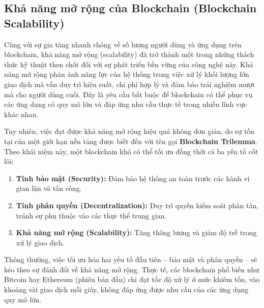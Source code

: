 

\subsection {Khả năng mở rộng của Blockchain (Blockchain Scalability)}
Cùng với sự gia tăng nhanh chóng về số lượng người dùng và ứng dụng trên blockchain, khả năng mở rộng (scalability) đã trở thành một trong những thách thức kỹ thuật then chốt đối với sự phát triển bền vững của công nghệ này. Khả năng mở rộng phản ánh năng lực của hệ thống trong việc xử lý khối lượng lớn giao dịch mà vẫn duy trì hiệu suất, chi phí hợp lý và đảm bảo trải nghiệm mượt mà cho người dùng cuối. Đây là yêu cầu bắt buộc để blockchain có thể phục vụ các ứng dụng có quy mô lớn và đáp ứng nhu cầu thực tế trong nhiều lĩnh vực khác nhau.

Tuy nhiên, việc đạt được khả năng mở rộng hiệu quả không đơn giản, do sự tồn tại của một giới hạn nền tảng được biết đến với tên gọi \textbf{Blockchain Trilemma}. Theo khái niệm này, một blockchain khó có thể tối ưu đồng thời cả ba yếu tố cốt lõi:
\begin{enumerate}
    \item \textbf{Tính bảo mật (Security):} Đảm bảo hệ thống an toàn trước các hành vi gian lận và tấn công.
    \item \textbf{Tính phân quyền (Decentralization):} Duy trì quyền kiểm soát phân tán, tránh sự phụ thuộc vào các thực thể trung gian.
    \item \textbf{Khả năng mở rộng (Scalability):} Tăng thông lượng và giảm độ trễ trong xử lý giao dịch.
\end{enumerate}

Thông thường, việc tối ưu hóa hai yếu tố đầu tiên – bảo mật và phân quyền – sẽ kéo theo sự đánh đổi về khả năng mở rộng. Thực tế, các blockchain phổ biến như Bitcoin hay Ethereum (phiên bản đầu) chỉ đạt tốc độ xử lý ở mức khiêm tốn, vào khoảng vài giao dịch mỗi giây, không đáp ứng được nhu cầu của các ứng dụng quy mô lớn.

